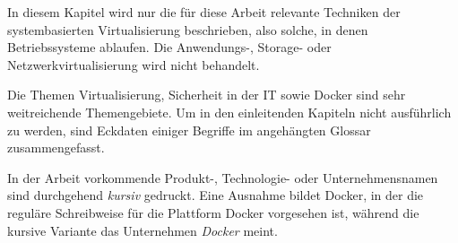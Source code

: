 \documentclass[../main.tex]{subfiles}
\begin{document}
    In diesem Kapitel wird nur die für diese Arbeit relevante Techniken der systembasierten Virtualisierung beschrieben, also solche, in denen Betriebssysteme ablaufen. Die Anwendungs-, Storage- oder Netzwerkvirtualisierung wird nicht behandelt.

    Die Themen Virtualisierung, Sicherheit in der IT sowie Docker sind sehr weitreichende Themengebiete. Um in den einleitenden Kapiteln nicht ausführlich zu werden, sind Eckdaten einiger Begriffe im angehängten Glossar zusammengefasst.

    In der Arbeit vorkommende Produkt-, Technologie- oder Unternehmensnamen sind durchgehend \emph{kursiv} gedruckt. Eine Ausnahme bildet Docker, in der die reguläre Schreibweise für die Plattform Docker vorgesehen ist, während die kursive Variante das Unternehmen \emph{Docker} meint.
\end{document}
